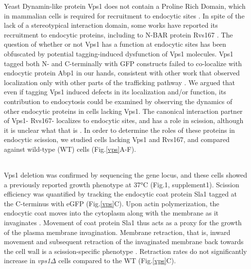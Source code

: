 \documentclass[9pt,lineno]{elife}
\begin{document}
Yeast Dynamin-like protein Vps1 does not contain a Proline Rich Domain, which in mammalian cells is required for recruitment to endocytic sites \citep{Grabs1997,Cestra1999,Farsad2001,Meinecke2013b}. In spite of the lack of a stereotypical interaction domain, some works have reported its recruitment to endocytic proteins, including to N-BAR protein Rvs167 \citep{Yu2004,Nannapaneni2010b,Rooij2010}. The question of whether or not Vps1 has a function at endocytic sites has been obfuscated by potential tagging-induced dysfunction of Vps1 molecules. Vps1 tagged both N- and C-terminally with GFP constructs failed to co-localize with endocytic protein Abp1 in our hands, consistent with other work that observed localization only with other parts of the trafficking pathway \citep{GoudGadila2017}. We argued that even if tagging Vps1 induced defects in its localization and/or function, its contribution to endocytosis could be examined by observing the dynamics of other endocytic proteins in cells lacking Vps1. The canonical interaction partner of Vps1- Rvs167- localizes to endocytic sites, and has a role in scission, although it is unclear what that is \citep{Kukulski2012,Picco2015}. In order to determine the roles of these proteins in endocytic scission, we studied cells lacking Vps1 and Rvs167, and compared against wild-type (WT) cells (Fig.\ref{vps}A-F).

~\\
Vps1 deletion was confirmed by sequencing the gene locus, and these cells showed a previously reported \citep{Rothman1986}  growth phenotype at 37\si{\degree}C (Fig.1, supplement1). Scission efficiency was quantified by tracking the endocytic coat protein Sla1 tagged at the C-terminus with eGFP (Fig.\ref{vps}C). Upon actin polymerization, the endocytic coat moves into the cytoplasm along with the membrane as it invaginates \citep{Skruzny2012}. Movement of coat protein Sla1 thus acts as a proxy for the growth of the plasma membrane invagination. Membrane retraction, that is, inward movement and subsequent retraction of the invaginated membrane back towards the cell wall is a scission-specific phenotype \citep{Kaksonen2005}. Retraction rates do not significantly increase in  \textit{vps1$\Delta$} cells compared to the WT (Fig.\ref{vps}C).
\end{document}
